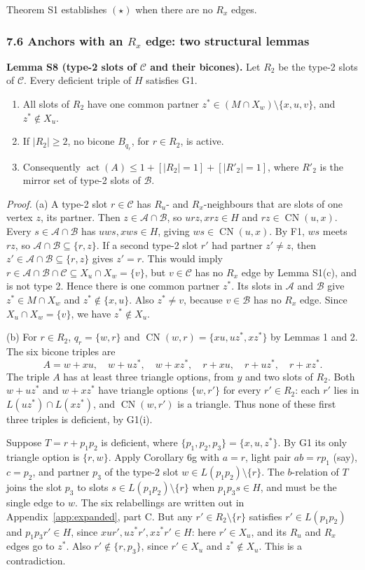 Theorem S1 establishes $(\star)$ when there are no $R_x$ edges.

\subsubsection*{7.6 Anchors with an $R_x$ edge: two structural lemmas}
\textbf{Lemma S8 (type-2 slots of $\mathcal C$ and their bicones).} Let $R_2$ be the type-2 slots of $\mathcal C$. Every deficient triple of $H$ satisfies G1.
\begin{enumerate}
\item[(a)] All slots of $R_2$ have one common partner $z^*\in(M\cap X_w)\setminus\{x,u,v\}$, and $z^*\notin X_u$.
\item[(b)] If $|R_2|\ge2$, no bicone $B_{q_r}$, for $r\in R_2$, is active.
\item[(c)] Consequently $\operatorname{act}(A)\le1+[|R_2|=1]+[|R'_2|=1]$, where $R'_2$ is the mirror set of type-2 slots of $\mathcal B$.
\end{enumerate}
\emph{Proof.} (a) A type-2 slot $r\in\mathcal C$ has $R_u$- and $R_x$-neighbours that are slots of one vertex $z$, its partner. Then $z\in\mathcal A\cap\mathcal B$, so $urz,xrz\in H$ and $rz\in\operatorname{CN}(u,x)$. Every $s\in\mathcal A\cap\mathcal B$ has $uws,xws\in H$, giving $ws\in\operatorname{CN}(u,x)$. By F1, $ws$ meets $rz$, so $\mathcal A\cap\mathcal B\subseteq\{r,z\}$. If a second type-2 slot $r'$ had partner $z'\ne z$, then $z'\in\mathcal A\cap\mathcal B\subseteq\{r,z\}$ gives $z'=r$. This would imply $r\in\mathcal A\cap\mathcal B\cap\mathcal C\subseteq X_u\cap X_w=\{v\}$, but $v\in\mathcal C$ has no $R_x$ edge by Lemma S1(c), and is not type 2. Hence there is one common partner $z^*$. Its slots in $\mathcal A$ and $\mathcal B$ give $z^*\in M\cap X_w$ and $z^*\notin\{x,u\}$. Also $z^*\ne v$, because $v\in\mathcal B$ has no $R_x$ edge. Since $X_u\cap X_w=\{v\}$, we have $z^*\notin X_u$.

(b) For $r\in R_2$, $q_r=\{w,r\}$ and $\operatorname{CN}(w,r)=\{xu,uz^*,xz^*\}$ by Lemmas 1 and 2. The six bicone triples are
\[
 A=w+xu,\quad w+uz^*,\quad w+xz^*,\quad
 r+xu,\quad r+uz^*,\quad r+xz^*.
\]
The triple $A$ has at least three triangle options, from $y$ and two slots of $R_2$. Both $w+uz^*$ and $w+xz^*$ have triangle options $\{w,r'\}$ for every $r'\in R_2$: each $r'$ lies in $L(uz^*)\cap L(xz^*)$, and $\operatorname{CN}(w,r')$ is a triangle. Thus none of these first three triples is deficient, by G1(i).

Suppose $T=r+p_1p_2$ is deficient, where $\{p_1,p_2,p_3\}=\{x,u,z^*\}$. By G1 its only triangle option is $\{r,w\}$. Apply Corollary 6g with $a=r$, light pair $ab=rp_1$ (say), $c=p_2$, and partner $p_3$ of the type-2 slot $w\in L(p_1p_2)\setminus\{r\}$. The $b$-relation of $T$ joins the slot $p_3$ to slots $s\in L(p_1p_2)\setminus\{r\}$ when $p_1p_3s\in H$, and must be the single edge to $w$.
The six relabellings are written out in Appendix~\ref{app:expanded}, part C.
But any $r'\in R_2\setminus\{r\}$ satisfies $r'\in L(p_1p_2)$ and $p_1p_3r'\in H$, since $xur',uz^*r',xz^*r'\in H$: here $r'\in X_u$, and its $R_u$ and $R_x$ edges go to $z^*$. Also $r'\notin\{r,p_3\}$, since $r'\in X_u$ and $z^*\notin X_u$. This is a contradiction.

